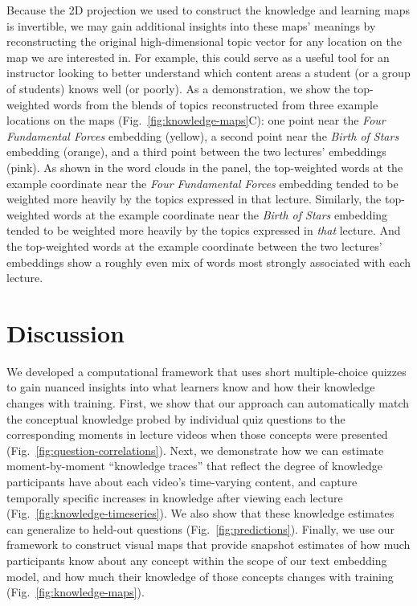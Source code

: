 \documentclass[10pt]{article}
\begin{document}
Because the 2D projection we used to construct the knowledge and learning maps
is invertible, we may gain additional insights into these maps' meanings by
reconstructing the original high-dimensional topic vector for any location on
the map we are interested in. For example, this could serve as a useful tool
for an instructor looking to better understand which content areas a student
(or a group of students) knows well (or poorly). As a demonstration, we show
the top-weighted words from the blends of topics reconstructed from three
example locations on the maps (Fig.~\ref{fig:knowledge-maps}C): one point near
the \textit{Four Fundamental Forces} embedding (yellow), a second point near
the \textit{Birth of Stars} embedding (orange), and a third point between the
two lectures' embeddings (pink). As shown in the word clouds in the panel, the
top-weighted words at the example coordinate near the \textit{Four Fundamental
Forces} embedding tended to be weighted more heavily by the topics expressed in
that lecture. Similarly, the top-weighted words at the example coordinate near
the \textit{Birth of Stars} embedding tended to be weighted more heavily by the
topics expressed in \textit{that} lecture. And the top-weighted words at the
example coordinate between the two lectures' embeddings show a roughly even mix
of words most strongly associated with each lecture.

\section*{Discussion}

We developed a computational framework that uses short multiple-choice quizzes
to gain nuanced insights into what learners know and how their knowledge
changes with training. First, we show that our approach can automatically match
the conceptual knowledge probed by individual quiz questions to the
corresponding moments in lecture videos when those concepts were presented
(Fig.~\ref{fig:question-correlations}). Next, we demonstrate how we can
estimate moment-by-moment ``knowledge traces'' that reflect the degree of
knowledge participants have about each video's time-varying content, and
capture temporally specific increases in knowledge after viewing each lecture
(Fig.~\ref{fig:knowledge-timeseries}). We also show that these knowledge
estimates can generalize to held-out questions (Fig.~\ref{fig:predictions}).
Finally, we use our framework to construct visual maps that provide snapshot
estimates of how much participants know about any concept within the scope of
our text embedding model, and how much their knowledge of those concepts
changes with training (Fig.~\ref{fig:knowledge-maps}).
\end{document}
